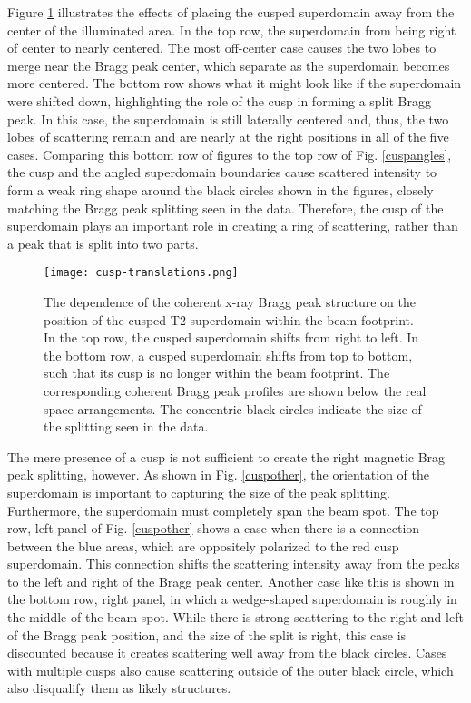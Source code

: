 \documentclass[aps, prb, reprint, showpacs, superscriptaddress]{revtex4-1}
\begin{document}
Figure \ref{cuspposition} illustrates the effects of placing the cusped superdomain away from the center of the illuminated area.
In the top row, the superdomain from being right of center to nearly centered.
The most off-center case causes the two lobes to merge near the Bragg peak center, which separate as the superdomain becomes more centered.
The bottom row shows what it might look like if the superdomain were shifted down, highlighting the role of the cusp in forming a split Bragg peak.
In this case, the superdomain is still laterally centered and, thus, the two lobes of scattering remain and are nearly at the right positions in all of the five cases.
Comparing this bottom row of figures to the top row of Fig. \ref{cuspangles}, the cusp and the angled superdomain boundaries cause scattered intensity to form a weak ring shape around the black circles shown in the figures, closely matching the Bragg peak splitting seen in the data.
Therefore, the cusp of the superdomain plays an important role in creating a ring of scattering, rather than a peak that is split into two parts.

\begin{figure}[ht]
\begin{center}
\texttt{[image: cusp-translations.png]}
\caption {
The dependence of the coherent x-ray Bragg peak structure on the position of the cusped T2 superdomain within the beam footprint.
In the top row, the cusped superdomain shifts from right to left.
In the bottom row, a cusped superdomain shifts from top to bottom, such that its cusp is no longer within the beam footprint.
The corresponding coherent Bragg peak profiles are shown below the real space arrangements. 
The concentric black circles indicate the size of the splitting seen in the data. 
}  \label{cuspposition}
\end{center}
\end{figure}

The mere presence of a cusp is not sufficient to create the right magnetic Brag peak splitting, however. 
As shown in Fig. \ref{cuspother}, the orientation of the superdomain is important to capturing the size of the peak splitting.
Furthermore, the superdomain must completely span the beam spot.
The top row, left panel of Fig. \ref{cuspother} shows a case when there is a connection between the blue areas, which are oppositely polarized to the red cusp superdomain. 
This connection shifts the scattering intensity away from the peaks to the left and right of the Bragg peak center.
Another case like this is shown in the bottom row, right panel, in which a wedge-shaped superdomain is roughly in the middle of the beam spot. 
While there is strong scattering to the right and left of the Bragg peak position, and the size of the split is right, this case is discounted because it creates scattering well away from the black circles.
Cases with multiple cusps also cause scattering outside of the outer black circle, which also disqualify them as likely structures.
\end{document}
